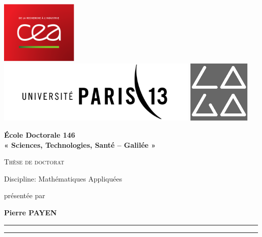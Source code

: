 \hypersetup{pageanchor=false}
\thispagestyle{empty}
\begin{titlepage}
\includegraphics[height = 3cm]{images/logo/CEA.pdf}
\hfill
\includegraphics[height = 3cm]{images/logo/P13.png}
\hfill
\includegraphics[height = 3cm]{images/logo/laga.jpg}


\begin{center}
{\Large \textbf{École Doctorale 146 \\« Sciences, Technologies, Santé – Galilée »}}


{\Huge \textsc{Thèse de doctorat}}


{\LARGE Discipline: Mathématiques Appliquées}


{\large présentée par}

{
    \textbf{{\LARGE Pierre PAYEN}}\\
}

\hrule
{}
{\LARGE \textbf{\doctitlefr}}
\hrule


\end{center}
\end{titlepage}
